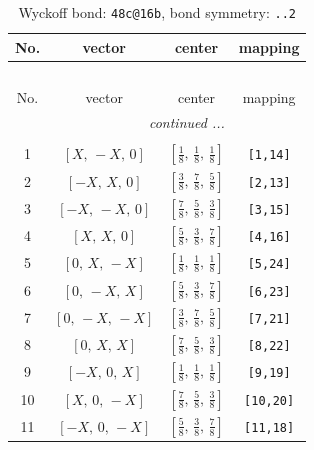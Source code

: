 \documentclass[fleqn,8pt]{jsarticle}
\begin{document}
\begin{longtable}{cccc}
\caption{Wyckoff bond: {\tt 48c@16b}, bond symmetry: {\tt ..2}}
 \\
 \hline \hline
No. & vector & center & mapping \\ \hline \endfirsthead

\multicolumn{3}{l}{\tablename\ \thetable{}} \\
 \hline \hline
No. & vector & center & mapping \\ \hline \endhead

 \hline \hline
\multicolumn{3}{r}{\footnotesize\it continued ...} \\ \endfoot

 \hline \hline
\multicolumn{3}{r}{} \\ \endlastfoot

1 & $\left[ X,\, - X,\, 0 \right]$ & $\left[ \frac{1}{8},\, \frac{1}{8},\, \frac{1}{8} \right]$ & {\tt [1,14]} \\ \hline
2 & $\left[ - X,\, X,\, 0 \right]$ & $\left[ \frac{3}{8},\, \frac{7}{8},\, \frac{5}{8} \right]$ & {\tt [2,13]} \\ \hline
3 & $\left[ - X,\, - X,\, 0 \right]$ & $\left[ \frac{7}{8},\, \frac{5}{8},\, \frac{3}{8} \right]$ & {\tt [3,15]} \\ \hline
4 & $\left[ X,\, X,\, 0 \right]$ & $\left[ \frac{5}{8},\, \frac{3}{8},\, \frac{7}{8} \right]$ & {\tt [4,16]} \\ \hline
5 & $\left[ 0,\, X,\, - X \right]$ & $\left[ \frac{1}{8},\, \frac{1}{8},\, \frac{1}{8} \right]$ & {\tt [5,24]} \\ \hline
6 & $\left[ 0,\, - X,\, X \right]$ & $\left[ \frac{5}{8},\, \frac{3}{8},\, \frac{7}{8} \right]$ & {\tt [6,23]} \\ \hline
7 & $\left[ 0,\, - X,\, - X \right]$ & $\left[ \frac{3}{8},\, \frac{7}{8},\, \frac{5}{8} \right]$ & {\tt [7,21]} \\ \hline
8 & $\left[ 0,\, X,\, X \right]$ & $\left[ \frac{7}{8},\, \frac{5}{8},\, \frac{3}{8} \right]$ & {\tt [8,22]} \\ \hline
9 & $\left[ - X,\, 0,\, X \right]$ & $\left[ \frac{1}{8},\, \frac{1}{8},\, \frac{1}{8} \right]$ & {\tt [9,19]} \\ \hline
10 & $\left[ X,\, 0,\, - X \right]$ & $\left[ \frac{7}{8},\, \frac{5}{8},\, \frac{3}{8} \right]$ & {\tt [10,20]} \\ \hline
11 & $\left[ - X,\, 0,\, - X \right]$ & $\left[ \frac{5}{8},\, \frac{3}{8},\, \frac{7}{8} \right]$ & {\tt [11,18]} \\ \hline

\end{longtable}
\end{document}
